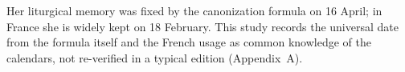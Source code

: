 Her liturgical memory was fixed by the canonization formula on 16
April; in France she is widely kept on 18 February. This study
records the universal date from the formula itself and the French
usage as common knowledge of the calendars, not re-verified in a
typical edition (Appendix~A).
